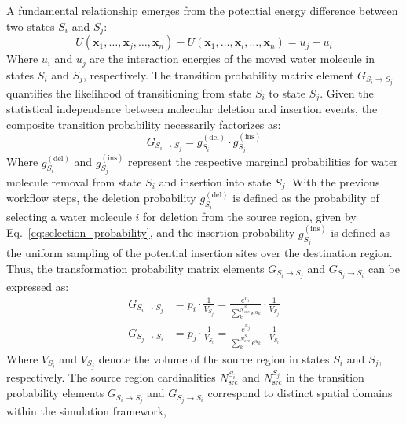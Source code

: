 \documentclass[journal=jacsat,manuscript=article]{achemso}
\begin{document}
A fundamental relationship emerges from the potential energy difference between two states $S_i$ and $S_j$:
\begin{equation}\label{eq:potential_energy_interaction}
U\left(\mathbf{x}_1, \ldots, \mathbf{x}_j,\ldots, \mathbf{x}_n\right) - U\left(\mathbf{x}_1, \ldots, \mathbf{x}_i,\ldots, \mathbf{x}_n\right) = u_j - u_i
\end{equation}
Where $u_i$ and $u_j$ are the interaction energies of the moved water molecule in states $S_i$ and $S_j$, respectively.
\newline
The transition probability matrix element $G_{S_i \to S_j}$ quantifies the likelihood of transitioning from state $S_i$ to state $S_j$. 
Given the statistical independence between molecular deletion and insertion events, 
the composite transition probability necessarily factorizes as:
\begin{equation}\label{eq:transition_probability_decomposition}
G_{S_i \to S_j} = g_{S_i}^{(\text{del})} \cdot g_{S_j}^{(\text{ins})}
\end{equation}
Where $g_{S_i}^{(\text{del})}$ and $g_{S_j}^{(\text{ins})}$ represent the respective marginal probabilities for water molecule removal from state $S_i$ and insertion into state $S_j$.
With the previous workflow steps, the deletion probability $g_{S_i}^{(\text{del})}$ is defined as the probability of selecting a water molecule $i$ for deletion from the source region, 
given by Eq.~\ref{eq:selection_probability}, 
and the insertion probability $g_{S_j}^{(\text{ins})}$ is defined as the uniform sampling of the potential insertion sites over the destination region.
Thus, the transformation probability matrix elements $G_{S_i \to S_j}$ and $G_{S_j \to S_i}$ can be expressed as:
\begin{equation}\label{eq:transition_probability}
  \begin{aligned}
G_{S_i \to S_j} &= p_i \cdot \frac{1}{V_{S_j}} = \frac{e^{u_i}}{\sum^{N^{S_i}_{src}}_k{e^{u_k}}} \cdot \frac{1}{V_{S_j}} \\
G_{S_j \to S_i} &= p_j \cdot \frac{1}{V_{S_i}} = \frac{e^{u_j}}{\sum^{N^{S_j}_{src}}_k{e^{u_k}}} \cdot \frac{1}{V_{S_i}}  
  \end{aligned}
\end{equation}
Where $V_{S_i}$ and $V_{S_j}$ denote the volume of the source region in states $S_i$ and $S_j$, respectively.
The source region cardinalities $N_{\text{src}}^{S_i}$ and $N_{\text{src}}^{S_j}$ in the transition probability elements $G_{S_i \to S_j}$ and $G_{S_j \to S_i}$ correspond to distinct spatial domains within the simulation framework, 
\end{document}
